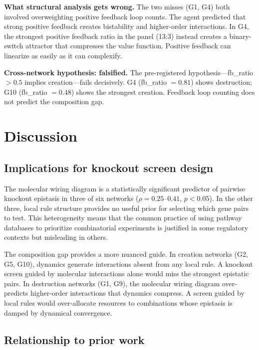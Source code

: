 \documentclass[11pt]{article}
\begin{document}
\textbf{What structural analysis gets wrong.}
The two misses (G1, G4) both involved overweighting positive feedback
loop counts. The agent predicted that strong positive feedback creates
bistability and higher-order interactions. In G4, the strongest
positive feedback ratio in the panel (13:3) instead creates a
binary-switch attractor that compresses the value function. Positive
feedback can linearize as easily as it can complexify.

\textbf{Cross-network hypothesis: falsified.}
The pre-registered hypothesis---fb\_ratio $> 0.5$ implies
creation---fails decisively. G4 (fb\_ratio $= 0.81$) shows
destruction; G10 (fb\_ratio $= 0.48$) shows the strongest creation.
Feedback loop counting does not predict the composition gap.


\section{Discussion}
\label{sec:discussion}

\subsection{Implications for knockout screen design}

The molecular wiring diagram is a statistically significant predictor
of pairwise knockout epistasis in three of six networks ($\rho =
0.25$--$0.41$, $p < 0.05$). In the other three, local rule structure
provides no useful prior for selecting which gene pairs to test. This
heterogeneity means that the common practice of using pathway
databases to prioritize combinatorial experiments is justified in some
regulatory contexts but misleading in others.

The composition gap provides a more nuanced guide. In creation
networks (G2, G5, G10), dynamics generate interactions absent from
any local rule. A knockout screen guided by molecular interactions
alone would miss the strongest epistatic pairs. In destruction
networks (G1, G9), the molecular wiring diagram over-predicts
higher-order interactions that dynamics compress. A screen guided by
local rules would over-allocate resources to combinations whose
epistasis is damped by dynamical convergence.

\subsection{Relationship to prior work}
\end{document}
